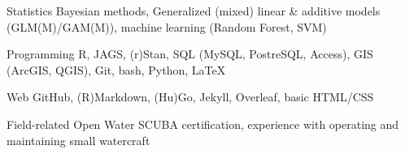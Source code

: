 

\begin{cvskills}


\cvskill
    {Statistics} %
    {Bayesian methods, Generalized (mixed) linear \& additive models (GLM(M)/GAM(M)), machine learning (Random Forest, SVM)} %
    
  \cvskill
    {Programming} %
    {R, JAGS, (r)Stan, SQL (MySQL, PostreSQL, Access), GIS (ArcGIS, QGIS), Git, bash, Python, LaTeX} %

  \cvskill
    {Web} %
    {GitHub, (R)Markdown, (Hu)Go, Jekyll, Overleaf, basic HTML/CSS} %

\cvskill
    {Field-related} %
    {Open Water SCUBA certification, experience with operating and maintaining small watercraft} %

\end{cvskills}
